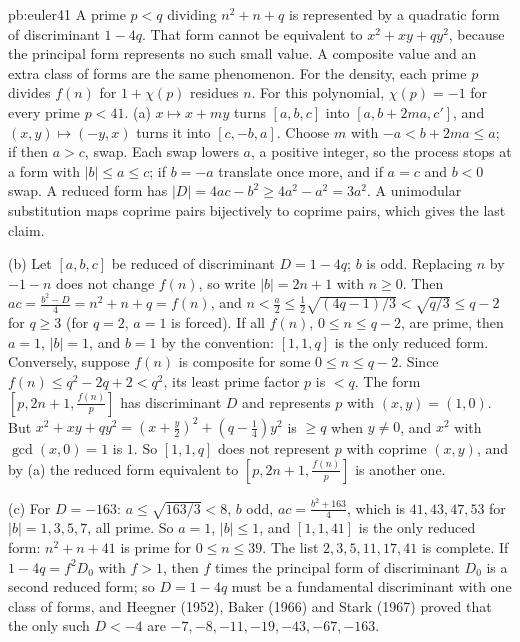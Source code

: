 \begin{solution}{pb:euler41}
\idea A prime $p<q$ dividing $n^2+n+q$ is represented by a quadratic form of discriminant $1-4q$. That form cannot be equivalent to $x^2+xy+qy^2$, because the principal form represents no such small value. A composite value and an extra class of forms are the same phenomenon. For the density, each prime $p$ divides $f(n)$ for $1+\chi(p)$ residues $n$. For this polynomial, $\chi(p)=-1$ for every prime $p<41$.
\writeup (a) $x\mapsto x+my$ turns $[a,b,c]$ into $[a,b+2ma,c']$, and $(x,y)\mapsto(-y,x)$ turns it into $[c,-b,a]$. Choose $m$ with $-a<b+2ma\le a$; if then $a>c$, swap. Each swap
lowers $a$, a positive integer, so the process stops at a form with $|b|\le a\le c$; if $b=-a$ translate once more, and if $a=c$ and $b<0$ swap. A reduced form has
$|D|=4ac-b^2\ge4a^2-a^2=3a^2$. A unimodular substitution maps coprime pairs bijectively to coprime pairs, which gives the last claim.

(b) Let $[a,b,c]$ be reduced of discriminant $D=1-4q$; $b$ is odd. Replacing $n$ by $-1-n$ does not change $f(n)$, so write $|b|=2n+1$ with $n\ge0$. Then
$ac=\frac{b^2-D}4=n^2+n+q=f(n)$, and $n<\frac a2\le\frac12\sqrt{(4q-1)/3}<\sqrt{q/3}\le q-2$ for $q\ge3$ (for $q=2$, $a=1$ is forced). If all $f(n)$, $0\le n\le q-2$, are prime, then
$a=1$, $|b|=1$, and $b=1$ by the convention: $[1,1,q]$ is the only reduced form. Conversely, suppose $f(n)$ is composite for some $0\le n\le q-2$. Since
$f(n)\le q^2-2q+2<q^2$, its least prime factor $p$ is $<q$. The form $[p,2n+1,\frac{f(n)}p]$ has discriminant $D$ and represents $p$ with $(x,y)=(1,0)$. But
$x^2+xy+qy^2=(x+\frac y2)^2+(q-\frac14)y^2$ is $\ge q$ when $y\ne0$, and $x^2$ with $\gcd(x,0)=1$ is $1$. So $[1,1,q]$ does not represent $p$ with coprime $(x,y)$, and by (a) the reduced form
equivalent to $[p,2n+1,\frac{f(n)}p]$ is another one.

(c) For $D=-163$: $a\le\sqrt{163/3}<8$, $b$ odd, $ac=\frac{b^2+163}4$, which is $41,43,47,53$ for $|b|=1,3,5,7$, all prime. So $a=1$, $|b|\le1$, and $[1,1,41]$ is the only reduced
form: $n^2+n+41$ is prime for $0\le n\le39$. The list $2,3,5,11,17,41$ is complete. If $1-4q=f^2D_0$ with $f>1$, then $f$ times the principal form of discriminant $D_0$ is a second
reduced form; so $D=1-4q$ must be a fundamental discriminant with one class of forms, and Heegner (1952), Baker (1966) and Stark (1967) proved that the only such $D<-4$ are
$-7,-8,-11,-19,-43,-67,-163$.


\end{solution}
